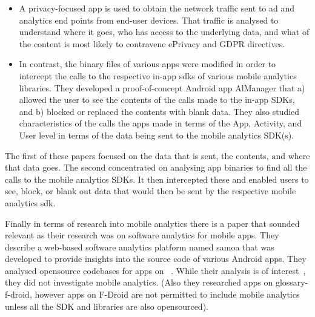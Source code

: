 \begin{itemize}
        \item A privacy-focused app is used to obtain the network traffic sent to ad and analytics end points from end-user devices. That traffic is analysed to understand where it goes, who has access to the underlying data, and what of the content is most likely to contravene ePrivacy and GDPR directives\cite{razaghpanah2018_apps_trackers_privacy_and_regulators_a_global_study_of_the_mobile_tracking_ecosystem}.
        \item In contrast, the binary files of various apps were modified in order to intercept the calls to the respective in-app \Glspl{sdk} of various mobile analytics libraries. They developed a proof-of-concept Android app AlManager that a) allowed the user to see the contents of the calls made to the in-app SDKs, and b) blocked or replaced the contents with blank data. They also studied characteristics of the calls the apps made in terms of the App, Activity, and User level in terms of the data being sent to the mobile analytics SDK(s)\cite{liu2020_privacy_risk_analysis_and_mitigation_of_analytics_libraries_in_the_android_ecosystem}.
\end{itemize}

The first of these papers focused on the data that is sent, the contents, and where that data goes. The second concentrated on analysing app binaries to find all the calls to the mobile analytics SDKs. It then intercepted these and enabled users to see, block, or blank out data that would then be sent by the respective mobile analytics \Gls{sdk}.

Finally in terms of research into mobile analytics there is a paper that sounded relevant as their research was on software analytics for mobile apps. They describe a web-based software analytics platform named \Gls{samoa} that was developed to provide insights into the source code of various Android apps. They analysed opensource codebases for apps on ~. While their analysis is of interest~, they did not investigate mobile analytics. (Also they researched apps on \Gls{glossary-f-droid}, however apps on F-Droid are not permitted to include mobile analytics unless all the SDK and libraries are also opensourced).

